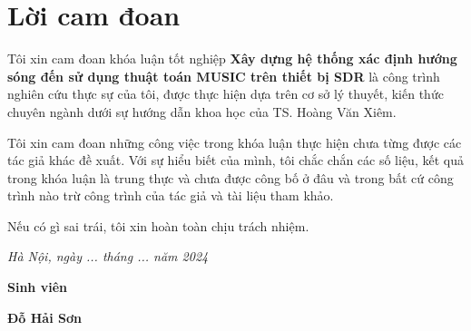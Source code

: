 \clearpage
{}

\chapter*{Lời cam đoan}

Tôi xin cam đoan khóa luận tốt nghiệp \textbf{Xây dựng hệ thống xác định hướng sóng đến sử dụng thuật toán MUSIC trên thiết bị SDR} là công trình nghiên cứu thực sự của tôi, được thực hiện dựa trên cơ sở lý thuyết, kiến thức chuyên ngành dưới sự hướng dẫn khoa học của TS. Hoàng Văn Xiêm.

Tôi xin cam đoan những công việc trong khóa luận thực hiện chưa từng được các tác giả khác đề xuất. Với sự hiểu biết của mình, tôi chắc chắn các số liệu, kết quả trong khóa luận là trung thực và chưa được công bố ở đâu và trong bất cứ công trình nào trừ công trình của tác giả và tài liệu tham khảo.

Nếu có gì sai trái, tôi xin hoàn toàn chịu trách nhiệm.

\vspace{1cm}
\hspace{7cm}\textit{Hà Nội, ngày ... tháng ... năm 2024}

\hspace{9.4cm}\textbf{Sinh viên}
\vspace{2.5cm}


\hspace{9.3cm}\textbf{Đỗ Hải Sơn}

